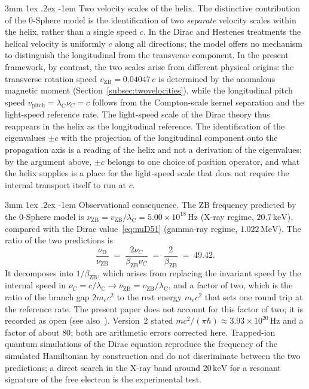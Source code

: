 \documentclass[%
 reprint, amsmath,amssymb, aps, prb, ]{revtex4-2}
\makeatletter
\numberwithin{equation}{section}
\renewcommand\paragraph{%
  \@startsection{paragraph}{4}{\z@}%
    {3mm \@plus 1ex \@minus .2ex}%
    {-1em}%
    {\normalfont\normalsize\itshape}}
\newcommand{\lambdaC}{\lambda_{\mathrm{C}}}
\makeatother
\begin{document}
\paragraph{Two velocity scales of the helix.} The distinctive contribution of the 0-Sphere model is the identification of two \emph{separate} velocity scales within the helix, rather than a single speed $c$. In the Dirac and Hestenes treatments the helical velocity is uniformly $c$ along all directions; the model offers no mechanism to distinguish the longitudinal from the transverse component. In the present framework, by contrast, the two scales arise from different physical origins: the transverse rotation speed $v_{\mathrm{ZB}} = 0.04047\,c$ is determined by the anomalous magnetic moment (Section~\ref{subsec:twovelocities}), while the longitudinal pitch speed $v_{\mathrm{pitch}} = \lambdaC\nu_C = c$ follows from the Compton-scale kernel separation and the light-speed reference rate. The light-speed scale of the Dirac theory thus reappears in the helix as the longitudinal reference. The identification of the eigenvalues $\pm c$ with the projection of the longitudinal component onto the propagation axis is a reading of the helix and not a derivation of the eigenvalues: by the argument above, $\pm c$ belongs to one choice of position operator, and what the helix supplies is a place for the light-speed scale that does not require the internal transport itself to run at $c$.

\paragraph{Observational consequence.} The ZB frequency predicted by the 0-Sphere model is $\nu_{\mathrm{ZB}} = v_{\mathrm{ZB}}/\lambdaC = 5.00\times10^{18}\,\mathrm{Hz}$ (X-ray regime, $20.7\,\mathrm{keV}$), compared with the Dirac value~\eqref{eq:nuD51} (gamma-ray regime, $1.022\,\mathrm{MeV}$). The ratio of the two predictions is
\begin{equation}
\frac{\nu_{\mathrm{D}}}{\nu_{\mathrm{ZB}}} \;=\; \frac{2\nu_C}{\beta_{\mathrm{ZB}}\nu_C} \;=\; \frac{2}{\beta_{\mathrm{ZB}}} \;=\; 49.42.
\label{eq:ratio51}
\end{equation}
It decomposes into $1/\beta_{\mathrm{ZB}}$, which arises from replacing the invariant speed by the internal speed in $\nu_C = c/\lambdaC \to \nu_{\mathrm{ZB}} = v_{\mathrm{ZB}}/\lambdaC$, and a factor of two, which is the ratio of the branch gap $2m_ec^2$ to the rest energy $m_ec^2$ that sets one round trip at the reference rate. The present paper does not account for this factor of two; it is recorded as open (see also~\cite{hanamura66}). Version~2 stated $mc^2/(\pi\hbar) \approx 3.93\times10^{20}\,\mathrm{Hz}$ and a factor of about $80$; both are arithmetic errors corrected here. Trapped-ion quantum simulations of the Dirac equation \cite{Gerritsma2010} reproduce the frequency of the simulated Hamiltonian by construction and do not discriminate between the two predictions; a direct search in the X-ray band around $20\,\mathrm{keV}$ for a resonant signature of the free electron is the experimental test.
\end{document}

